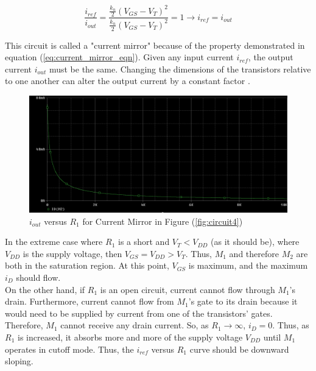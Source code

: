 \begin{equation}
	\label{eq:current_mirror_eqn}
	\frac{ i_{ref} }{ i_{out} } = \frac{ \frac{k_n}{2} ( V_{GS} - V_{T} )^2 }{ \frac{k_n}{2} ( V_{GS} - V_{T} )^2 } = 1 \rightarrow i_{ref} = i_{out}
\end{equation}

This circuit is called a "current mirror" because of the property demonstrated in equation (\ref{eq:current_mirror_eqn}). Given any input current $i_{ref}$, the output current $i_{out}$ must be the same. Changing the dimensions of the transistors relative to one another can alter the output current by a constant factor \cite{current_src_dim}. \\

\FloatBarrier

\begin{figure}[h!]
	\centering
	\includegraphics[scale=0.5]{./images/circuit4_r_sweep.PNG}
	\caption{$i_{out}$ versus $R_1$ for Current Mirror in Figure (\ref{fig:circuit4})}
	\label{fig:circuit4_r_sweep}
\end{figure}

\FloatBarrier

In the extreme case where $R_1$ is a short and $V_{T} < V_{DD}$ (as it should be), where $V_{DD}$ is the supply voltage, then $V_{GS} = V_{DD} > V_{T}$. Thus, $M_1$ and therefore $M_2$ are both in the saturation region. At this point, $V_{GS}$ is maximum, and the maximum $i_D$ should flow. \\

On the other hand, if $R_1$ is an open circuit, current cannot flow through $M_1$'s drain. Furthermore, current cannot flow from $M_1$'s gate to its drain because it would need to be supplied by current from one of the transistors' gates. Therefore, $M_1$ cannot receive any drain current. So, as $R_1 \rightarrow \infty$, $i_D = 0$. Thus, as $R_1$ is increased, it absorbs more and more of the supply voltage $V_{DD}$ until $M_1$ operates in cutoff mode. Thus, the $i_{ref}$ versus $R_1$ curve should be downward sloping. \\


